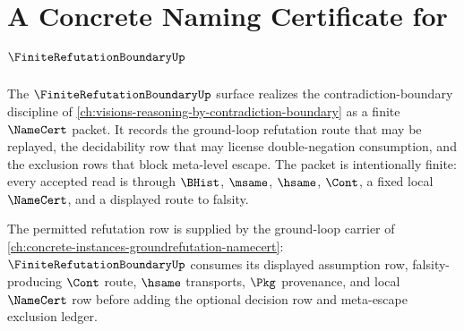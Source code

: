 \chapter{A Concrete Naming Certificate for $\FiniteRefutationBoundaryUp$}
\label{ch:concrete-instances-finiterefutationboundary-namecert}

The $\FiniteRefutationBoundaryUp$ surface realizes the contradiction-boundary discipline of \autoref{ch:visions-reasoning-by-contradiction-boundary} as a finite $\NameCert$ packet. It records the ground-loop refutation route that may be replayed, the decidability row that may license double-negation consumption, and the exclusion rows that block meta-level escape. The packet is intentionally finite: every accepted read is through $\BHist$, $\msame$, $\hsame$, $\Cont$, a fixed local $\NameCert$, and a displayed route to falsity.

The permitted refutation row is supplied by the ground-loop carrier of \autoref{ch:concrete-instances-groundrefutation-namecert}: $\FiniteRefutationBoundaryUp$ consumes its displayed assumption row, falsity-producing $\Cont$ route, $\hsame$ transports, $\Pkg$ provenance, and local $\NameCert$ row before adding the optional decision row and meta-escape exclusion ledger.

